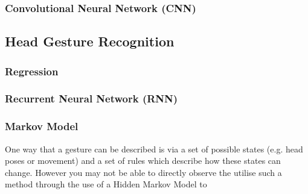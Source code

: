 \subsubsection{Convolutional Neural Network (CNN)}



\subsection{Head Gesture Recognition}
\subsubsection{Regression}

\subsubsection{Recurrent Neural Network (RNN)}

\subsubsection{Markov Model}
One way that a gesture can be described is via a set of possible states (e.g. head poses or movement) and a set of rules which describe how these states can change.
However you may not be able to directly observe the 
\citeauthor{elmezain2008hidden} utilise such a method through the use of a Hidden Markov Model to \cite{elmezain2008hidden}

